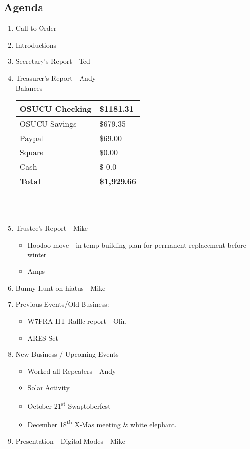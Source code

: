 \documentclass[letter,11pt]{extarticle}
\begin{document}
	\subsection*{Agenda}
	\begin{enumerate}
		\item Call to Order
		\item Introductions
		\item Secretary's Report - Ted
		\item Treasurer's Report - Andy \\
				Balances \\
			\begin{tabular}{|l|l|} \hline
				OSUCU Checking & \$1181.31 \\ \hline
				OSUCU Savings & \$679.35 \\ \hline
				Paypal & \$69.00 \\ \hline
				Square & \$0.00 \\ \hline
				Cash & \$ 0.0 \\ \hline
				\textbf{Total} & \textbf{\$1,929.66} \\ \hline
			\end{tabular} \\ \\
		\item Trustee's Report - Mike
			\begin{itemize}
				\item Hoodoo move - in temp building plan for permanent replacement before winter
				\item Amps
			\end{itemize}
		\item Bunny Hunt on hiatus - Mike
		\item Previous Events/Old Business:
			\begin{itemize}
				\item W7PRA HT Raffle report - Olin
				\item ARES Set
				\end{itemize}
		\item  New Business / Upcoming Events
			\begin{itemize}
				\item Worked all Repeaters - Andy
				\item Solar Activity
				\item October 21\textsuperscript{st} Swaptoberfest
				\item December 18\textsuperscript{th} X-Mas meeting \& white elephant.
			\end{itemize}
		\item  Presentation - Digital Modes - Mike
	\end{enumerate}
\end{document}
